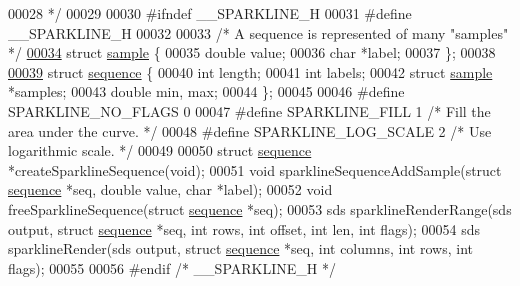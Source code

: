 \begin{DoxyCode}
00028 \textcolor{comment}{ */}
00029 
00030 \textcolor{preprocessor}{#}\textcolor{preprocessor}{ifndef} \textcolor{preprocessor}{\_\_SPARKLINE\_H}
00031 \textcolor{preprocessor}{#}\textcolor{preprocessor}{define} \textcolor{preprocessor}{\_\_SPARKLINE\_H}
00032 
00033 \textcolor{comment}{/* A sequence is represented of many "samples" */}
\hyperlink{structsample}{00034} \textcolor{keyword}{struct} \hyperlink{structsample}{sample} \{
00035     \textcolor{keywordtype}{double} value;
00036     \textcolor{keywordtype}{char} *label;
00037 \};
00038 
\hyperlink{structsequence}{00039} \textcolor{keyword}{struct} \hyperlink{structsequence}{sequence} \{
00040     \textcolor{keywordtype}{int} length;
00041     \textcolor{keywordtype}{int} labels;
00042     \textcolor{keyword}{struct} \hyperlink{structsample}{sample} *samples;
00043     \textcolor{keywordtype}{double} min, max;
00044 \};
00045 
00046 \textcolor{preprocessor}{#}\textcolor{preprocessor}{define} \textcolor{preprocessor}{SPARKLINE\_NO\_FLAGS} 0
00047 \textcolor{preprocessor}{#}\textcolor{preprocessor}{define} \textcolor{preprocessor}{SPARKLINE\_FILL} 1      \textcolor{comment}{/* Fill the area under the curve. */}
00048 \textcolor{preprocessor}{#}\textcolor{preprocessor}{define} \textcolor{preprocessor}{SPARKLINE\_LOG\_SCALE} 2 \textcolor{comment}{/* Use logarithmic scale. */}
00049 
00050 \textcolor{keyword}{struct} \hyperlink{structsequence}{sequence} *createSparklineSequence(\textcolor{keywordtype}{void});
00051 \textcolor{keywordtype}{void} sparklineSequenceAddSample(\textcolor{keyword}{struct} \hyperlink{structsequence}{sequence} *seq, \textcolor{keywordtype}{double} value, \textcolor{keywordtype}{char} *label);
00052 \textcolor{keywordtype}{void} freeSparklineSequence(\textcolor{keyword}{struct} \hyperlink{structsequence}{sequence} *seq);
00053 sds sparklineRenderRange(sds output, \textcolor{keyword}{struct} \hyperlink{structsequence}{sequence} *seq, \textcolor{keywordtype}{int} rows, \textcolor{keywordtype}{int} offset, \textcolor{keywordtype}{int} len, \textcolor{keywordtype}{int} 
      flags);
00054 sds sparklineRender(sds output, \textcolor{keyword}{struct} \hyperlink{structsequence}{sequence} *seq, \textcolor{keywordtype}{int} columns, \textcolor{keywordtype}{int} rows, \textcolor{keywordtype}{int} flags);
00055 
00056 \textcolor{preprocessor}{#}\textcolor{preprocessor}{endif} \textcolor{comment}{/* \_\_SPARKLINE\_H */}
\end{DoxyCode}

